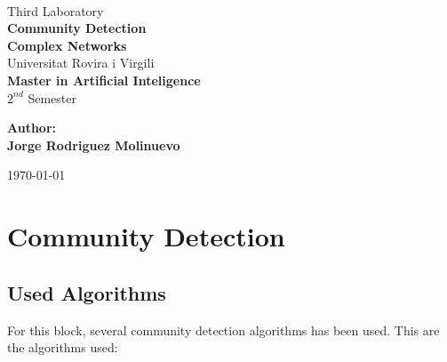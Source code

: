 \documentclass[12pt,a4paper,oneside]{article}
\date{\today}
\numberwithin{equation}{section}
\numberwithin{equation}{section}
\theoremstyle{definition}
\begin{document}
\begin{center}
	\textbf{ }\\[4cm]
	
	\LARGE Third Laboratory\\[0.5cm]
	\textbf{{\Huge Community Detection}}\\[0.5cm]
	\textbf{{\LARGE Complex Networks}}\\[1.5cm]
	
	{\Large Universitat Rovira i Virgili}\\[2.3cm]
	{\LARGE \textbf{Master in Artificial Inteligence}}\\[0.5cm]
	{\LARGE $2^{nd}$ Semester}\\[2.5cm]
	
	\begin{flushright}
		\textbf{\large{Author:}\\ \normalsize{Jorge Rodriguez Molinuevo\\}}
	\end{flushright}
	\today
\end{center}
\thispagestyle{empty} 

\pagebreak

\section{Community Detection}

\subsection{Used Algorithms}
For this block, several community detection algorithms has been used. This are the algorithms used:
\end{document}
